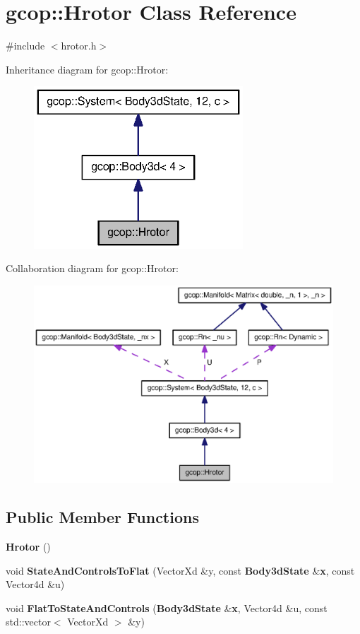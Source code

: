 \section{gcop\-:\-:\-Hrotor \-Class \-Reference}
\label{classgcop_1_1Hrotor}


{\ttfamily \#include $<$hrotor.\-h$>$}



\-Inheritance diagram for gcop\-:\-:\-Hrotor\-:
\nopagebreak
\begin{figure}[H]
\begin{center}
\leavevmode
\includegraphics[width=222pt]{classgcop_1_1Hrotor__inherit__graph}
\end{center}
\end{figure}


\-Collaboration diagram for gcop\-:\-:\-Hrotor\-:
\nopagebreak
\begin{figure}[H]
\begin{center}
\leavevmode
\includegraphics[width=350pt]{classgcop_1_1Hrotor__coll__graph}
\end{center}
\end{figure}
\subsection*{\-Public \-Member \-Functions}
\begin{DoxyCompactItemize}
\item 
{\bf \-Hrotor} ()
\item 
void {\bf \-State\-And\-Controls\-To\-Flat} (\-Vector\-Xd \&y, const {\bf \-Body3d\-State} \&{\bf x}, const \-Vector4d \&u)
\item 
void {\bf \-Flat\-To\-State\-And\-Controls} ({\bf \-Body3d\-State} \&{\bf x}, \-Vector4d \&u, const std\-::vector$<$ \-Vector\-Xd $>$ \&y)
\end{DoxyCompactItemize}
